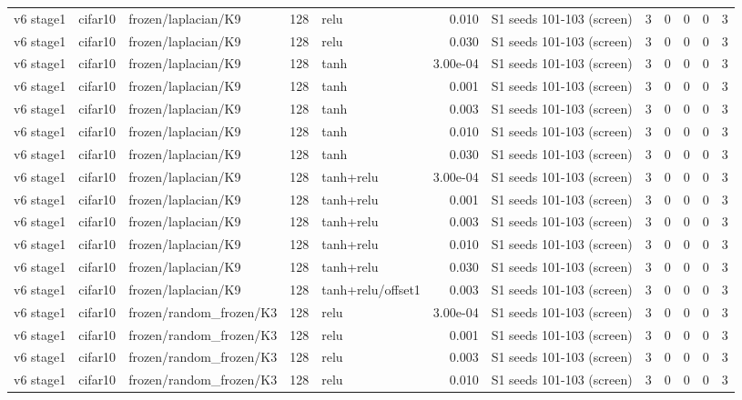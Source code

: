 \begin{table}[htbp]
{\begin{tabular}{@{}lllrlrlrrrrr@{}}
v6 stage1 & cifar10 & frozen/laplacian/K9 & 128 & relu & 0.010 & S1 seeds 101-103 (screen) & 3 & 0 & 0 & 0 & 3 \\
v6 stage1 & cifar10 & frozen/laplacian/K9 & 128 & relu & 0.030 & S1 seeds 101-103 (screen) & 3 & 0 & 0 & 0 & 3 \\
v6 stage1 & cifar10 & frozen/laplacian/K9 & 128 & tanh & 3.00e-04 & S1 seeds 101-103 (screen) & 3 & 0 & 0 & 0 & 3 \\
v6 stage1 & cifar10 & frozen/laplacian/K9 & 128 & tanh & 0.001 & S1 seeds 101-103 (screen) & 3 & 0 & 0 & 0 & 3 \\
v6 stage1 & cifar10 & frozen/laplacian/K9 & 128 & tanh & 0.003 & S1 seeds 101-103 (screen) & 3 & 0 & 0 & 0 & 3 \\
v6 stage1 & cifar10 & frozen/laplacian/K9 & 128 & tanh & 0.010 & S1 seeds 101-103 (screen) & 3 & 0 & 0 & 0 & 3 \\
v6 stage1 & cifar10 & frozen/laplacian/K9 & 128 & tanh & 0.030 & S1 seeds 101-103 (screen) & 3 & 0 & 0 & 0 & 3 \\
v6 stage1 & cifar10 & frozen/laplacian/K9 & 128 & tanh+relu & 3.00e-04 & S1 seeds 101-103 (screen) & 3 & 0 & 0 & 0 & 3 \\
v6 stage1 & cifar10 & frozen/laplacian/K9 & 128 & tanh+relu & 0.001 & S1 seeds 101-103 (screen) & 3 & 0 & 0 & 0 & 3 \\
v6 stage1 & cifar10 & frozen/laplacian/K9 & 128 & tanh+relu & 0.003 & S1 seeds 101-103 (screen) & 3 & 0 & 0 & 0 & 3 \\
v6 stage1 & cifar10 & frozen/laplacian/K9 & 128 & tanh+relu & 0.010 & S1 seeds 101-103 (screen) & 3 & 0 & 0 & 0 & 3 \\
v6 stage1 & cifar10 & frozen/laplacian/K9 & 128 & tanh+relu & 0.030 & S1 seeds 101-103 (screen) & 3 & 0 & 0 & 0 & 3 \\
v6 stage1 & cifar10 & frozen/laplacian/K9 & 128 & tanh+relu/offset1 & 0.003 & S1 seeds 101-103 (screen) & 3 & 0 & 0 & 0 & 3 \\
v6 stage1 & cifar10 & frozen/random\_frozen/K3 & 128 & relu & 3.00e-04 & S1 seeds 101-103 (screen) & 3 & 0 & 0 & 0 & 3 \\
v6 stage1 & cifar10 & frozen/random\_frozen/K3 & 128 & relu & 0.001 & S1 seeds 101-103 (screen) & 3 & 0 & 0 & 0 & 3 \\
v6 stage1 & cifar10 & frozen/random\_frozen/K3 & 128 & relu & 0.003 & S1 seeds 101-103 (screen) & 3 & 0 & 0 & 0 & 3 \\
v6 stage1 & cifar10 & frozen/random\_frozen/K3 & 128 & relu & 0.010 & S1 seeds 101-103 (screen) & 3 & 0 & 0 & 0 & 3 \\

\end{tabular}}
\end{table}
